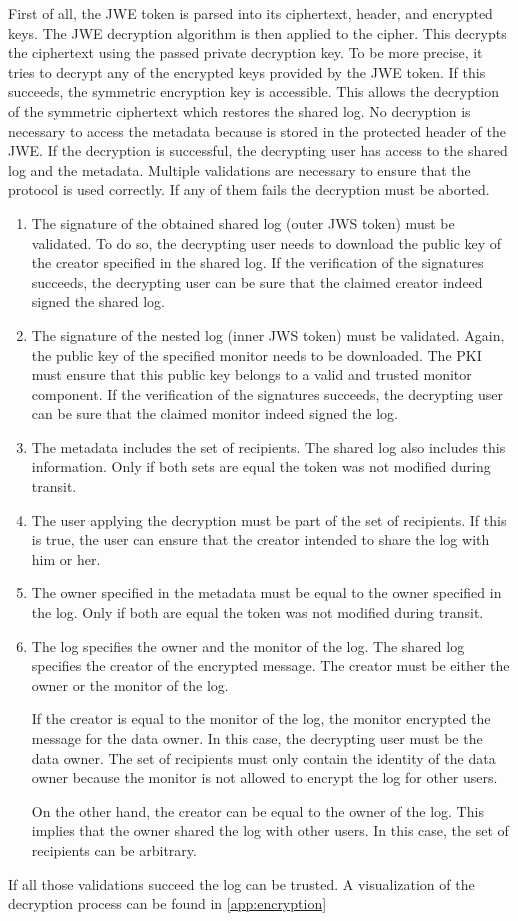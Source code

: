 \documentclass[../main.tex]{subfiles}
\begin{document}
First of all, the JWE token is parsed into its ciphertext, header, and encrypted keys.
The JWE decryption algorithm is then applied to the cipher.
This decrypts the ciphertext using the passed private decryption key.
To be more precise, it tries to decrypt any of the encrypted keys provided by the JWE token.
If this succeeds, the symmetric encryption key is accessible.
This allows the decryption of the symmetric ciphertext which restores the shared log.
No decryption is necessary to access the metadata because is stored in the protected header of the JWE.
If the decryption is successful, the decrypting user has access to the shared log and the metadata.
Multiple validations are necessary to ensure that the protocol is used correctly.
If any of them fails the decryption must be aborted.
\begin{enumerate}
    \item 
    The signature of the obtained shared log (outer JWS token) must be validated.
    To do so, the decrypting user needs to download the public key of the creator specified in the shared log.
    If the verification of the signatures succeeds, the decrypting user can be sure that the claimed creator indeed signed the shared log.
    \item
    The signature of the nested log (inner JWS token) must be validated.
    Again, the public key of the specified monitor needs to be downloaded.
    The PKI must ensure that this public key belongs to a valid and trusted monitor component.
    If the verification of the signatures succeeds, the decrypting user can be sure that the claimed monitor indeed signed the log.
    \item
    The metadata includes the set of recipients.
    The shared log also includes this information.
    Only if both sets are equal the token was not modified during transit.
    \item
    The user applying the decryption must be part of the set of recipients.
    If this is true, the user can ensure that the creator intended to share the log with him or her.
    \item
    The owner specified in the metadata must be equal to the owner specified in the log.
    Only if both are equal the token was not modified during transit.
    \item
    The log specifies the owner and the monitor of the log.
    The shared log specifies the creator of the encrypted message.
    The creator must be either the owner or the monitor of the log.
    
    If the creator is equal to the monitor of the log, the monitor encrypted the message for the data owner.
    In this case, the decrypting user must be the data owner.
    The set of recipients must only contain the identity of the data owner because the monitor is not allowed to encrypt the log for other users.

    On the other hand, the creator can be equal to the owner of the log.
    This implies that the owner shared the log with other users.
    In this case, the set of recipients can be arbitrary.
\end{enumerate}
If all those validations succeed the log can be trusted.
A visualization of the decryption process can be found in \cref{app:encryption}
\end{document}
